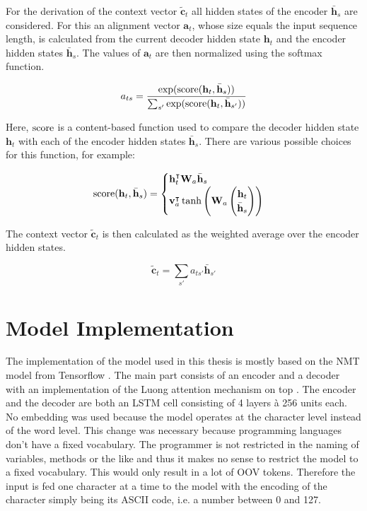 For the derivation of the context vector \(\tilde{\mathbf{c}}_t\) all hidden states of the encoder \(\bar{\mathbf{h}}_s\) are considered. For this an alignment vector \(\mathbf{a}_t\), whose size equals the input sequence length, is calculated from the current decoder hidden state \(\mathbf{h}_t\) and the encoder hidden states \(\bar{\mathbf{h}}_s\). The values of \(\mathbf{a}_t\) are then normalized using the softmax function.

\begin{equation*}
  a_{ts} = \frac
            {\exp(\operatorname{score}(\mathbf{h}_t, \bar{\mathbf{h}}_s))}
            {\sum_{s'} \exp(\operatorname{score}(\mathbf{h}_t, \bar{\mathbf{h}}_{s'}))}
\end{equation*}

Here, \(\operatorname{score}\) is a content-based function used to compare the decoder hidden state \(\mathbf{h}_t\) with each of the encoder hidden states \(\bar{\mathbf{h}}_s\). There are various possible choices for this function, for example:

\begin{equation*}
  \operatorname{score}(\mathbf{h}_t, \bar{\mathbf{h}}_s) =
  \begin{cases}
    \mathbf{h}_t^\intercal \mathbf{W}_a \bar{\mathbf{h}}_s \\
    \mathbf{v}_a^\intercal \tanh \left(\mathbf{W}_a \begin{pmatrix} \mathbf{h}_t \\ \bar{\mathbf{h}}_s \end{pmatrix} \right)
  \end{cases}
\end{equation*}

The context vector \(\tilde{\mathbf{c}}_t\) is then calculated as the weighted average over the encoder hidden states.

\begin{equation*}
  \tilde{\mathbf{c}}_t = \sum_{s'} a_{ts'} \bar{\mathbf{h}}_{s'}
\end{equation*}

\section{Model Implementation}

The implementation of the model used in this thesis is mostly based on the NMT model from Tensorflow \cite{seq2seq_tutorial}. The main part consists of an encoder and a decoder with an implementation of the Luong attention mechanism on top \cite{attention_luong}. The encoder and the decoder are both an LSTM cell consisting of 4 layers \`a 256 units each. No embedding was used because the model operates at the character level instead of the word level. This change was necessary because programming languages don't have a fixed vocabulary. The programmer is not restricted in the naming of variables, methods or the like and thus it makes no sense to restrict the model to a fixed vocabulary. This would only result in a lot of OOV tokens. Therefore the input is fed one character at a time to the model with the encoding of the character simply being its ASCII code, i.e. a number between 0 and 127.

